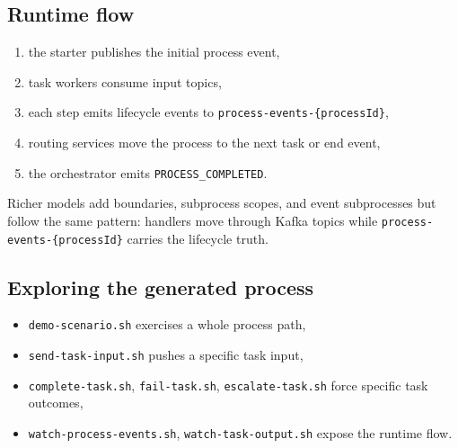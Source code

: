 \subsection{Runtime flow}

\begin{enumerate}
\item the starter publishes the initial process event,
\item task workers consume input topics,
\item each step emits lifecycle events to \texttt{process-events-\{processId\}},
\item routing services move the process to the next task or end event,
\item the orchestrator emits \texttt{PROCESS\_COMPLETED}.
\end{enumerate}

Richer models add boundaries, subprocess scopes, and event subprocesses but
follow the same pattern: handlers move through Kafka topics while
\texttt{process-events-\{processId\}} carries the lifecycle truth.

\subsection{Exploring the generated process}

\begin{itemize}
\item \texttt{demo-scenario.sh} exercises a whole process path,
\item \texttt{send-task-input.sh} pushes a specific task input,
\item \texttt{complete-task.sh}, \texttt{fail-task.sh}, \texttt{escalate-task.sh}
  force specific task outcomes,
\item \texttt{watch-process-events.sh}, \texttt{watch-task-output.sh}
  expose the runtime flow.
\end{itemize}

